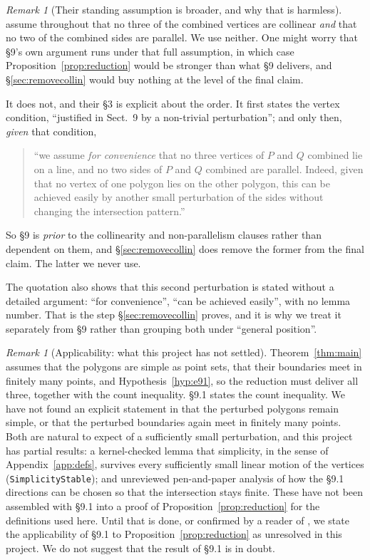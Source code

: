 \documentclass[11pt,a4paper]{article}
\theoremstyle{plain}
\theoremstyle{definition}
\theoremstyle{remark}
\newtheorem{remark}[theorem]{Remark}
\begin{document}
\begin{remark}[Their standing assumption is broader, and why that is harmless]
\cite{AckermanKeszeghRote2022} assume throughout that no three of the combined
vertices are collinear \emph{and} that no two of the combined sides are
parallel. We use neither. One might worry that \S9's own argument runs under
that full assumption, in which case Proposition~\ref{prop:reduction} would be
stronger than what \S9 delivers, and \S\ref{sec:removecollin} would buy nothing
at the level of the final claim.

It does not, and their \S3 is explicit about the order. It first states the
vertex condition, ``justified in Sect.~9 by a non-trivial perturbation''; and
only then, \emph{given} that condition,

\begin{quote}
``we assume \emph{for convenience} that no three vertices of $P$ and $Q$
combined lie on a line, and no two sides of $P$ and $Q$ combined are parallel.
Indeed, given that no vertex of one polygon lies on the other polygon, this can
be achieved easily by another small perturbation of the sides without changing
the intersection pattern.''
\end{quote}

\noindent
So \S9 is \emph{prior} to the collinearity and non-parallelism clauses rather
than dependent on them, and \S\ref{sec:removecollin} does remove the former from
the final claim. The latter we never use.

The quotation also shows that this second perturbation is stated without a
detailed argument: ``for convenience'', ``can be achieved easily'', with no
lemma number. That is the step \S\ref{sec:removecollin} proves, and it is why
we treat it separately from \S9 rather than grouping both under ``general
position''.
\end{remark}

\begin{remark}[Applicability: what this project has not settled]\label{rem:simplicity}
Theorem~\ref{thm:main} assumes that the polygons are simple as point sets, that
their boundaries meet in finitely many points, and Hypothesis~\ref{hyp:e91}, so
the reduction must deliver all three, together with the count inequality.
\S9.1 states the count inequality. We have not found an explicit statement in
\cite{AckermanKeszeghRote2022} that the perturbed polygons remain simple, or
that the perturbed boundaries again meet in finitely many points. Both are
natural to expect of a sufficiently small perturbation, and this project has
partial results: a kernel-checked lemma that simplicity, in the sense of
Appendix~\ref{app:defs}, survives every sufficiently small linear motion of the
vertices (\texttt{SimplicityStable}); and unreviewed pen-and-paper analysis of
how the \S9.1 directions can be chosen so that the intersection stays finite.
These have not been assembled with \S9.1 into a proof of
Proposition~\ref{prop:reduction} for the definitions used here. Until that is
done, or confirmed by a reader of \cite{AckermanKeszeghRote2022}, we state the
applicability of \S9.1 to Proposition~\ref{prop:reduction} as unresolved in
this project. We do not suggest that the result of \S9.1 is in doubt.
\end{remark}
\end{document}
